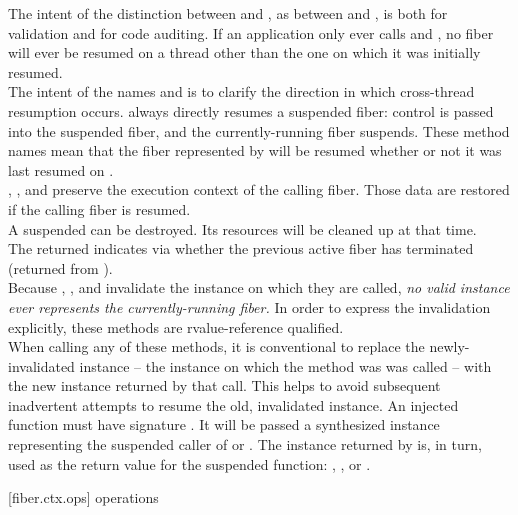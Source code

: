 The intent of the distinction between \resume and \xtresume, as between
\resumewith and \xtresumewith, is both for validation and for code auditing. If
an application only ever calls \resume and \resumewith, no fiber will ever be
resumed on a thread other than the one on which it was initially resumed.\\

The intent of the names \xtresume and \xtresumewith is to clarify the direction
in which cross-thread resumption occurs. \Currthread always directly resumes a
suspended fiber: control is passed into the suspended fiber, and the
currently-running fiber suspends. These method names mean that the fiber
represented by  will be resumed whether or not it was last resumed
on \currthread.\\

\resume, \resumewith, \xtresume and \xtresumewith preserve the execution context
of the calling fiber. Those data are restored if the calling fiber is resumed.\\
A suspended  can be destroyed. Its resources will be
cleaned up at that time.\\
The returned  indicates via  whether the
previous active fiber has terminated (returned from \entryfn).\\
Because \resume, \resumewith, \xtresume and \xtresumewith invalidate the
instance on which they are called, \emph{no valid \fiber instance ever
represents the currently-running fiber.} In order to express the invalidation
explicitly, these methods are rvalue-reference qualified.\\
When calling any of these methods, it is conventional to replace the
newly-invalidated instance -- the instance on which the method was was called
-- with the new instance returned by that call. This helps to avoid subsequent
inadvertent attempts to resume the old, invalidated instance.
\newline
An injected function  must have signature
. It will be passed a
synthesized \fiber instance representing the suspended caller of \resumewith or
\xtresumewith. The \fiber instance returned by  is, in turn, used as
the return value for the suspended function: \resume, \resumewith, \xtresume or
\xtresumewith.



[fiber.ctx.ops]{ operations}

